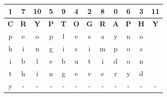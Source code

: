 \documentclass{ashoka-crypto}
\begin{document}
\begin{center}
\begin{tabular}{|c|c|c|c|c|c|c|c|c|c|c|c|}
\hline
1          & 7          & 10         & 5          & 9          & 4          & 2          & 8          & 0          & 6          & 3          & 11         \\ \hline
\textbf{C} & \textbf{R} & \textbf{Y} & \textbf{P} & \textbf{T} & \textbf{O} & \textbf{G} & \textbf{R} & \textbf{A} & \textbf{P} & \textbf{H} & \textbf{Y} \\ \hline
p          & e          & o          & p          & l          & e          & s          & a          & y          & n          & o          &            \\ \hline
h          & i          & n          & g          & i          & s          & i          & m          & p          & o          & s          &            \\ \hline
i          & b          & l          & e          & b          & u          & t          & i          & d          & o          & n          &            \\ \hline
t          & h          & i          & n         & g          & e          & v          & e          & r          & y          & d          &            \\ \hline
y          &     -       &    -        &      -     &     -       &      -      &     -       &     -       &      -      &     -       &       -     &  -            \\ \hline
\end{tabular}
\end{center}
\end{document}
